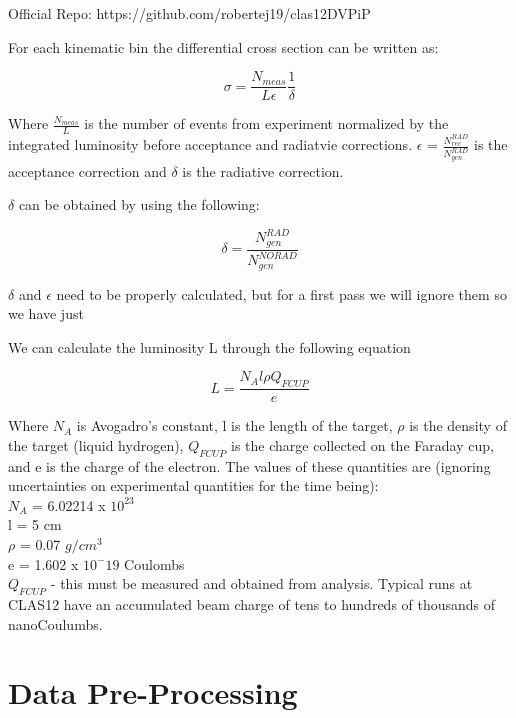 \clearpage


Official Repo: https://github.com/robertej19/clas12DVPiP
         


For each kinematic bin the differential cross section can be written as:

\begin{equation}
    \sigma = \frac{N_{meas}}{L \epsilon}\frac{1}{\delta}
\end{equation}

Where $\frac{N_{meas}}{L}$ is the number of events from experiment normalized by the integrated luminosity before acceptance and radiatvie corrections. $\epsilon$ = $\frac{N^{RAD}_{rec}}{{N^{RAD}_{gen}}}$ is the acceptance correction and $\delta$ is the radiative correction.



$\delta$ can be obtained by using the following:

\begin{equation}
    \delta = \frac{N^{RAD}_{gen}}{N^{NORAD}_{gen}}
\end{equation}

$\delta$ and $\epsilon$ need to be properly calculated, but for a first pass we will ignore them so we have just



We can calculate the luminosity L through the following equation

\begin{equation}
    L = \frac{N_A l \rho Q_{FCUP}}{e}
\end{equation}

Where $N_A$ is Avogadro's constant, l is the length of the target,  $\rho$ is the density of the target (liquid hydrogen), $Q_{FCUP}$ is the charge collected on the Faraday cup, and e is the charge of the electron. The values of these quantities are (ignoring uncertainties on experimental quantities for the time being):\\

$N_A$ = 6.02214 x $10^{23}$\\
l = 5 cm\\
$\rho$ = 0.07 $g/cm^3$\\
e = 1.602 x $10^-19$ Coulombs\\
$Q_{FCUP}$ - this must be measured and obtained from analysis. Typical runs at CLAS12 have an accumulated beam charge of tens to hundreds of thousands of nanoCoulumbs. 

\section{Data Pre-Processing}
